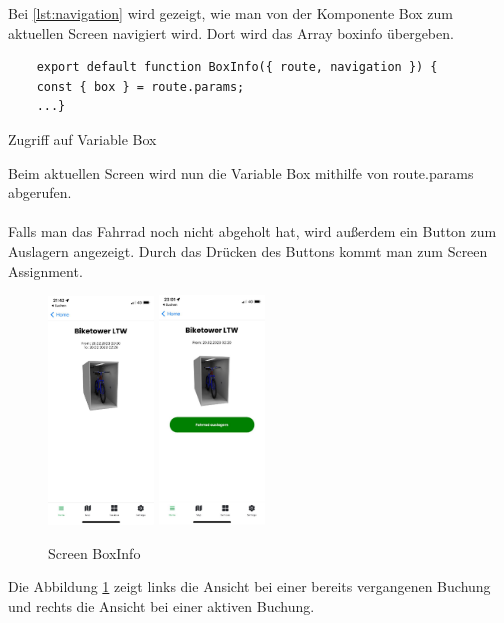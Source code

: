 Bei \ref*{lst:navigation} wird gezeigt, wie man von der Komponente Box zum aktuellen Screen navigiert wird. Dort wird das Array boxinfo übergeben.\\
\begin{listing}[H]
  \begin{verbatim}
    export default function BoxInfo({ route, navigation }) {
    const { box } = route.params;
    ...}
\end{verbatim}
  \caption{Zugriff auf Variable Box}
  \label{lst:zugriff}
\end{listing}
Beim aktuellen Screen wird nun die Variable Box mithilfe von route.params abgerufen. \\ \\
Falls man das Fahrrad noch nicht abgeholt hat, wird außerdem ein Button zum Auslagern angezeigt. Durch das Drücken des Buttons kommt man zum Screen Assignment.\\
\begin{figure}[H]
  \centering
  \includegraphics[width=0.25\textwidth]{images/app-screenshots/screenboxinfo.png}
  \includegraphics[width=0.25\textwidth]{images/app-screenshots/screenboxinfov.png}
  \caption{Screen BoxInfo}
  \label{fig:screenboxinfo}
\end{figure}
Die Abbildung \ref{fig:screenboxinfo} zeigt links die Ansicht bei einer bereits vergangenen Buchung und rechts die Ansicht bei einer aktiven Buchung.\\


